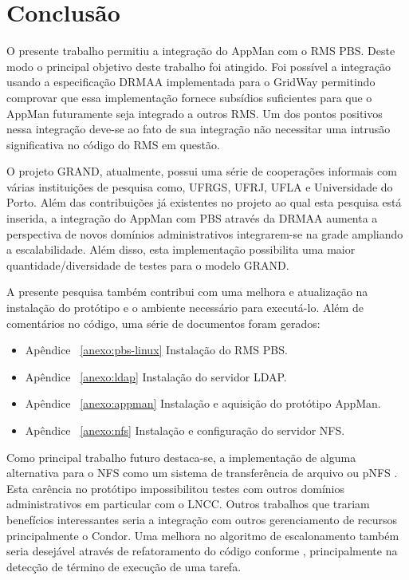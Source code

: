\chapter{Conclusão}
\label{cap:conclusao}

O presente trabalho permitiu a integração do AppMan com o RMS PBS. Deste modo o principal objetivo deste trabalho foi atingido. Foi possível a integração usando a especificação DRMAA implementada para o GridWay permitindo comprovar que essa implementação fornece subsídios suficientes para que o AppMan futuramente seja integrado a outros RMS. Um dos pontos positivos nessa integração deve-se ao fato de sua integração não necessitar uma intrusão significativa no código do RMS em questão.  

O projeto GRAND, atualmente, possui uma série de cooperações informais com várias instituições de pesquisa como, UFRGS, UFRJ, UFLA e Universidade do Porto. Além das contribuições já existentes no projeto ao qual esta pesquisa está inserida, a integração do AppMan com PBS através da DRMAA aumenta a perspectiva de novos domínios administrativos integrarem-se na grade ampliando a escalabilidade. Além disso, esta implementação possibilita uma maior quantidade/diversidade de testes para o modelo GRAND. 

A presente pesquisa também contribui com uma melhora e atualização na instalação do protótipo e o ambiente necessário para executá-lo. Além de comentários no código, uma série de documentos foram gerados:

\begin{itemize}
	\item Apêndice ~\ref{anexo:pbs-linux} Instalação do RMS PBS.
	\item Apêndice ~\ref{anexo:ldap} Instalação do servidor LDAP.
	\item Apêndice ~\ref{anexo:appman} Instalação e aquisição do protótipo AppMan.
	\item Apêndice ~\ref{anexo:nfs} Instalação e configuração do servidor NFS.
\end{itemize}

Como principal trabalho futuro destaca-se, a implementação de alguma alternativa para o NFS como um sistema de transferência de arquivo ou pNFS \cite{pNFS}. Esta carência no protótipo impossibilitou testes com outros domínios administrativos em particular com o LNCC. Outros trabalhos que trariam benefícios interessantes seria a integração com outros gerenciamento de recursos principalmente o Condor. Uma melhora no algoritmo de escalonamento também seria desejável através de refatoramento do código conforme \cite{Nobres2008}, principalmente na detecção de término de execução de uma tarefa.